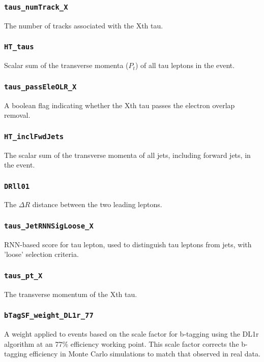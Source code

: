 \subsubsection{\texttt{taus\_numTrack\_X}} The number of tracks associated with the Xth tau.

\subsubsection{\texttt{HT\_taus}} Scalar sum of the transverse momenta ($P_t$) of all tau leptons in the event.

\subsubsection{\texttt{taus\_passEleOLR\_X}} A boolean flag indicating whether the Xth tau passes the electron overlap
removal.

\subsubsection{\texttt{HT\_inclFwdJets}} The scalar sum of the transverse momenta of all jets, including forward jets, in
the event.

\subsubsection{\texttt{DRll01}} The $\Delta R$ distance between the two leading leptons.

\subsubsection{\texttt{taus\_JetRNNSigLoose\_X}} RNN-based score for tau lepton, used to distinguish tau leptons from
jets, with 'loose' selection criteria.

\subsubsection{\texttt{taus\_pt\_X}} The transverse momentum of the Xth tau.

\subsubsection{\texttt{bTagSF\_weight\_DL1r\_77}} A weight applied to events based on the scale factor for b-tagging using
the DL1r algorithm at an 77\% efficiency working point. This scale factor corrects the b-tagging efficiency in Monte
Carlo simulations to match that observed in real data.

